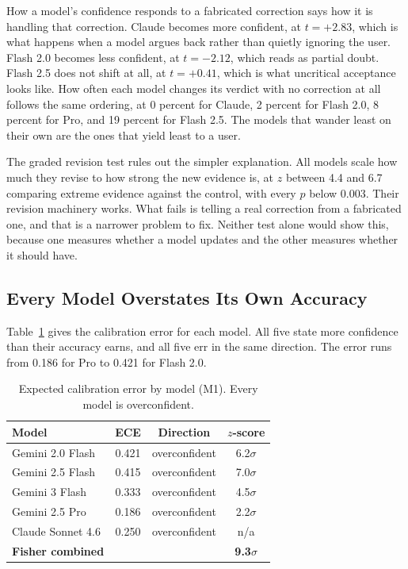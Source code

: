 \documentclass[conference]{IEEEtran}
\begin{document}
How a model's confidence responds to a fabricated correction says how it is handling that correction. Claude becomes more confident, at $t = +2.83$, which is what happens when a model argues back rather than quietly ignoring the user. Flash 2.0 becomes less confident, at $t = -2.12$, which reads as partial doubt. Flash 2.5 does not shift at all, at $t = +0.41$, which is what uncritical acceptance looks like. How often each model changes its verdict with no correction at all follows the same ordering, at 0 percent for Claude, 2 percent for Flash 2.0, 8 percent for Pro, and 19 percent for Flash 2.5. The models that wander least on their own are the ones that yield least to a user.

The graded revision test rules out the simpler explanation. All models scale how much they revise to how strong the new evidence is, at $z$ between 4.4 and 6.7 comparing extreme evidence against the control, with every $p$ below 0.003. Their revision machinery works. What fails is telling a real correction from a fabricated one, and that is a narrower problem to fix. Neither test alone would show this, because one measures whether a model updates and the other measures whether it should have.

\subsection{Every Model Overstates Its Own Accuracy}

Table~\ref{tab:m1} gives the calibration error for each model. All five state more confidence than their accuracy earns, and all five err in the same direction. The error runs from 0.186 for Pro to 0.421 for Flash 2.0.

\begin{table}[htbp]
\caption{Expected calibration error by model (M1). Every model is overconfident.}
\label{tab:m1}
\centering
\begin{tabular}{@{}lccc@{}}
\toprule
\textbf{Model} & \textbf{ECE} & \textbf{Direction} & \textbf{$z$-score} \\
\midrule
Gemini 2.0 Flash & 0.421 & overconfident & 6.2$\sigma$ \\
Gemini 2.5 Flash & 0.415 & overconfident & 7.0$\sigma$ \\
Gemini 3 Flash & 0.333 & overconfident & 4.5$\sigma$ \\
Gemini 2.5 Pro & 0.186 & overconfident & 2.2$\sigma$ \\
Claude Sonnet 4.6 & 0.250 & overconfident & n/a \\
\midrule
\textbf{Fisher combined} & & & \textbf{9.3$\sigma$} \\
\bottomrule
\end{tabular}
\end{table}
\end{document}
